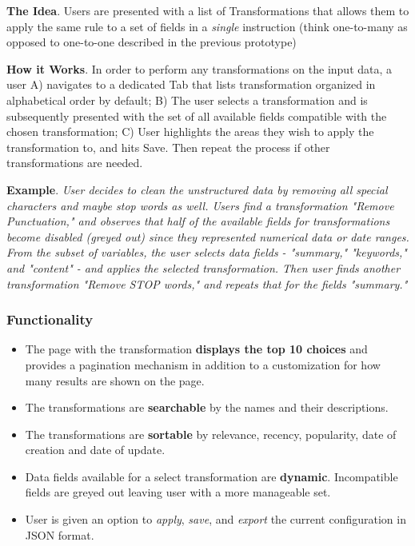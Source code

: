 \documentclass[12pt,letterpaper]{article}
\begin{document}
\textbf{The Idea}.
Users are presented with a list of Transformations that allows them to apply the same rule to a set of fields in a \textit{single} instruction (think one-to-many as opposed to one-to-one described in the previous prototype)

\textbf{How it Works}. In order to perform any transformations on the input data, a user A) navigates to a dedicated Tab that lists transformation organized in alphabetical order by default; B) The user selects a transformation and is subsequently presented with the set of all available fields compatible with the chosen transformation; C) User highlights the areas they wish to apply the transformation to, and hits Save. Then repeat the process if other transformations are needed.

\textbf{Example}. \textit{User decides to clean the unstructured data by removing all special characters and maybe stop words as well. Users find a transformation "Remove Punctuation," and observes that half of the available fields for transformations become disabled (greyed out) since they represented numerical data or date ranges. From the subset of variables, the user selects data fields - "summary," "keywords," and "content" - and applies the selected transformation. Then user finds another transformation "Remove STOP words," and repeats that for the fields "summary."}

\subsubsection*{Functionality}

\begin{itemize}
    \item The page with the transformation \textbf{displays the top 10 choices} and provides a pagination mechanism in addition to a customization for how many results are shown on the page.
    \item The transformations are \textbf{searchable} by the names and their descriptions. 
    \item The transformations are \textbf{sortable} by relevance, recency, popularity, date of creation and date of update.
    \item Data fields available for a select transformation are \textbf{dynamic}. Incompatible fields are greyed out leaving user with a more manageable set.
    \item User is given an option to \textit{apply}, \textit{save}, and \textit{export} the current configuration in JSON format.
\end{itemize}
\end{document}
